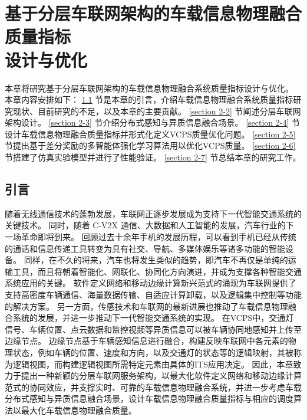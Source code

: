 \chapter[基于分层车联网架构的车载信息物理融合质量指标设计与优化]{基于分层车联网架构的车载信息物理融合质量指标\\设计与优化}
本章将研究基于分层车联网架构的车载信息物理融合系统质量指标设计与优化。
本章内容安排如下：
\ref{section 2-1} 节是本章的引言，介绍车载信息物理融合系统质量指标研究现状、目前研究的不足，以及本章的主要贡献。
\ref{section 2-2} 节阐述分层车联网架构设计。
\ref{section 2-3} 节介绍分布式感知与异质信息融合场景。
\ref{section 2-4} 节设计车载信息物理融合质量指标并形式化定义VCPS质量优化问题。
\ref{section 2-5} 节提出基于差分奖励的多智能体强化学习算法用以优化VCPS质量。
\ref{section 2-6} 节搭建了仿真实验模型并进行了性能验证。
\ref{section 2-7} 节总结本章的研究工作。

\section{引言}\label{section 2-1}

随着无线通信技术的蓬勃发展，车联网正逐步发展成为支持下一代智能交通系统的关键技术。
同时，随着 C-V2X 通信、大数据和人工智能的发展，汽车行业的下一场革命即将到来。
回顾过去十余年手机的发展历程，可以看到手机已经从传统的通话和信息传递工具转变为具有社交、导航、多媒体娱乐等诸多功能的智能设备。
同样，在不久的将来，汽车也将发生类似的趋势，即汽车不再仅是单纯的运输工具，而且将朝着智能化、网联化、协同化方向演进，并成为支撑各种智能交通系统应用的关键。
软件定义网络\cite{li2021zhi}和移动边缘计算\cite{liu2022fedcpf}新兴范式的涌现为车联网提供了支持高密度车辆通信、海量数据传输、自适应计算卸载，以及逻辑集中控制等功能的解决方案。
另一方面，传感技术和车联网的最新进展也推动了车载信息物理融合系统\cite{jia2015survey}的发展，并进一步推动下一代智能交通系统的实现。
在VCPS中，交通灯信号、车辆位置、点云数据和监控视频等异质信息可以被车辆协同地感知并上传至边缘节点。
边缘节点基于车辆感知信息进行融合，构建反映车联网中各元素的物理状态，例如车辆的位置、速度和方向，以及交通灯的状态等的逻辑映射，其被称为逻辑视图，而构建逻辑视图所需特定元素由具体的ITS应用决定。
因此，本章致力于提出一种新颖的分层车联网服务架构，以最大化软件定义网络和移动边缘计算范式的协同效应，并支撑实时、可靠的车载信息物理融合系统，并进一步考虑车载分布式感知与异质信息融合场景，设计车载信息物理融合质量指标与相应的调度算法以最大化车载信息物理融合质量。

